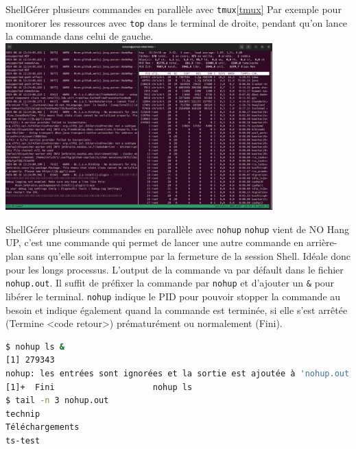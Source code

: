 \documentclass{beamer}
\begin{document}
    \begin{frame}{Shell}{Gérer plusieurs commandes en parallèle avec \lstinline{tmux}\cref{tmux}}
        Par exemple pour monitorer les ressources avec \lstinline{top} dans le terminal de droite, pendant qu'on lance la commande dans celui de gauche.
        \bigbreak
        \centering
        \includegraphics[width=10.3cm]{image/tmux-illustration}
    \end{frame}

    \begin{frame}[fragile]{Shell}{Gérer plusieurs commandes en parallèle avec \lstinline{nohup}}
        \lstinline{nohup} vient de NO Hang UP, c'est une commande qui permet de lancer une autre commande en arrière-plan sans qu'elle soit interrompue par la fermeture de la session Shell.
        Idéale donc pour les longs processus.
        L'output de la commande va par défault dans le fichier \lstinline{nohup.out}.
        \bigbreak
        Il suffit de préfixer la commande par \lstinline{nohup} et d'ajouter un \lstinline{&} pour libérer le terminal.
        \lstinline{nohup} indique le PID pour pouvoir stopper la commande au besoin et indique également quand la commande est terminée, si elle s'est arrêtée (Termine <code retour>) prématurément ou normalement (Fini).
        \begin{lstlisting}[language=bash]
$ nohup ls &
[1] 279343
nohup: les entrées sont ignorées et la sortie est ajoutée à 'nohup.out'
[1]+  Fini                    nohup ls
$ tail -n 3 nohup.out
technip
Téléchargements
ts-test
        \end{lstlisting}
    \end{frame}
\end{document}
